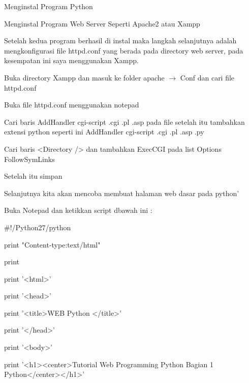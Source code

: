 \documentclass{wileySix}
\begin{document}
\begin{myEnumerate}
	\item Menginstal Program Python \par
	\noindent 
	\item Menginstal Program Web Server Seperti Apache2 atau Xampp \par
	\noindent 
	\item Setelah kedua program berhasil di instal maka langkah selanjutnya adalah mengkonfigurasi file httpd.conf yang berada pada directory web server, pada kesempatan ini saya menggunakan Xampp. \par
	\noindent 
	\item Buka directory Xampp dan masuk ke folder apache  $  \rightarrow  $ Conf dan cari file httpd.conf \par
	\noindent 
	\item Buka file httpd.conf menggunakan notepad \par
	\noindent 
	\item Cari baris AddHandler cgi-script .cgi .pl .asp pada file setelah itu tambahkan extensi python seperti ini AddHandler cgi-script .cgi .pl .asp .py \par
	\noindent 
	\item Cari baris <Directory /> dan tambahkan ExecCGI pada list Options FollowSymLinks \par
	\noindent 
	\item Setelah itu simpan \par
	\noindent 
	\item Selanjutnya kita akan mencoba membuat halaman web dasar pada python’ \par
	\noindent 
	\item Buka Notepad dan ketikkan script dbawah ini : \par
	\vspace{12pt}
	\noindent 
	$  \#  $!/Python27/python \par
	\noindent 
	print "Content-type:text/html" \par
	\noindent 
	print \par
	\noindent 
	print '<html>' \par
	\noindent 
	print '<head>' \par
	\noindent 
	print '<title>WEB Python </title>' \par
	\noindent 
	print '</head>' \par
	\noindent 
	print '<body>' \par
	\noindent 
	print '<h1><center>Tutorial Web Programming Python Bagian 1 Python</center></h1>' \par

\end{myEnumerate}
\end{document}
